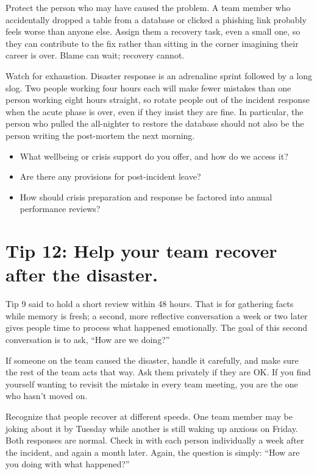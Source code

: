 \documentclass[10pt,letterpaper]{article}
\begin{document}
Protect the person who may have caused the problem.  A team member who
accidentally dropped a table from a database or clicked a phishing link probably
feels worse than anyone else.  Assign them a recovery task, even a small one, so
they can contribute to the fix rather than sitting in the corner imagining their
career is over.  Blame can wait; recovery cannot.

Watch for exhaustion.  Disaster response is an adrenaline sprint followed by a
long slog.  Two people working four hours each will make fewer mistakes than one
person working eight hours straight, so rotate people out of the incident
response when the acute phase is over, even if they insist they are fine.  In
particular, the person who pulled the all-nighter to restore the database should
not also be the person writing the post-mortem the next morning.

\begin{notebox}
  \begin{itemize}
  \item What wellbeing or crisis support do you offer, and how do we access it?
  \item Are there any provisions for post-incident leave?
  \item How should crisis preparation and response be factored into annual
    performance reviews?
  \end{itemize}
\end{notebox}

\section*{Tip 12: Help your team recover after the disaster.}

Tip 9 said to hold a short review within 48 hours. That is for gathering facts
while memory is fresh; a second, more reflective conversation a week or two
later gives people time to process what happened emotionally.  The goal of this
second conversation is to ask, ``How are we doing?''

If someone on the team caused the disaster, handle it carefully, and make sure
the rest of the team acts that way.  Ask them privately if they are OK.  If you
find yourself wanting to revisit the mistake in every team meeting, you are the
one who hasn't moved on.

Recognize that people recover at different speeds.  One team member may be
joking about it by Tuesday while another is still waking up anxious on Friday.
Both responses are normal.  Check in with each person individually a week after
the incident, and again a month later.  Again, the question is simply: ``How are
you doing with what happened?''
\end{document}
